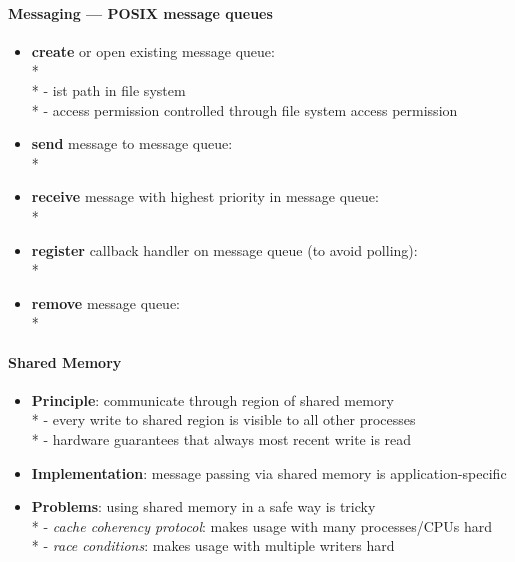 \paragraph{Messaging --- POSIX message queues}
\begin{itemize}
  \item \textbf{create} or open existing message queue: \\*
     \\*
    -  ist path in file system \\*
    - access permission controlled through file system access permission
  \item \textbf{send} message to message queue: \\*
  \item \textbf{receive} message with highest priority in message queue: \\*
  \item \textbf{register} callback handler on message queue (to avoid polling): \\*
  \item \textbf{remove} message queue: \\*
\end{itemize}

\paragraph{Shared Memory}
\begin{itemize}
  \item \textbf{Principle}: communicate through region of shared memory \\*
    - every write to shared region is visible to all other processes \\*
    - hardware guarantees that always most recent write is read
  \item \textbf{Implementation}: message passing via shared memory is application-specific
  \item \textbf{Problems}: using shared memory in a safe way is tricky \\*
    - \emph{cache coherency protocol}: makes usage with many processes/CPUs hard \\*
    - \emph{race conditions}: makes usage with multiple writers hard
\end{itemize}

